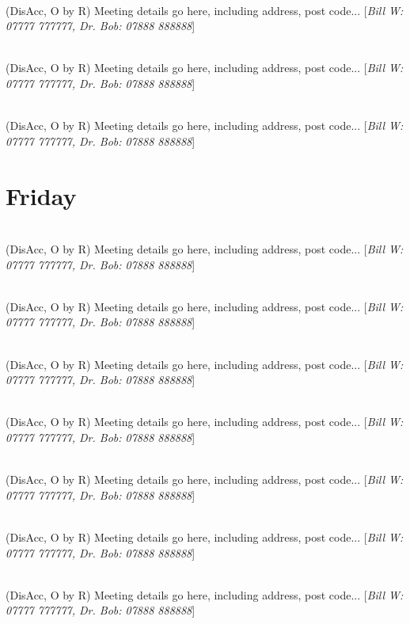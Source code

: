\documentclass[a4paper]{article}
\newcommand{\mtgname}[1] {\vspace{0.1cm}{\bf #1}\\}   %
\newcommand{\mtgtime}[1] {\hspace{-0.2cm}{\small #1}} %
\newcommand{\mtgdetails}[1] {#1}                      %
\newcommand{\mtgphones}[1] {[\textit{#1}]}            %
\begin{document}
\mtgname{Meeting name goes here}
\mtgtime{12:45--13:45} \mtgdetails{(DisAcc, O by R) Meeting details go here, including address, post code...}
\mtgphones{Bill W: 07777 777777, Dr. Bob: 07888 888888}

\mtgname{Meeting name goes here}
\mtgtime{12:45--13:45} \mtgdetails{(DisAcc, O by R) Meeting details go here, including address, post code...}
\mtgphones{Bill W: 07777 777777, Dr. Bob: 07888 888888}

\mtgname{Meeting name goes here}
\mtgtime{12:45--13:45} \mtgdetails{(DisAcc, O by R) Meeting details go here, including address, post code...}
\mtgphones{Bill W: 07777 777777, Dr. Bob: 07888 888888}

\section*{Friday}

\mtgname{Meeting name goes here}
\mtgtime{12:45--13:45} \mtgdetails{(DisAcc, O by R) Meeting details go here, including address, post code...}
\mtgphones{Bill W: 07777 777777, Dr. Bob: 07888 888888}

\mtgname{Meeting name goes here}
\mtgtime{12:45--13:45} \mtgdetails{(DisAcc, O by R) Meeting details go here, including address, post code...}
\mtgphones{Bill W: 07777 777777, Dr. Bob: 07888 888888}

\mtgname{Meeting name goes here}
\mtgtime{12:45--13:45} \mtgdetails{(DisAcc, O by R) Meeting details go here, including address, post code...}
\mtgphones{Bill W: 07777 777777, Dr. Bob: 07888 888888}

\mtgname{Meeting name goes here}
\mtgtime{12:45--13:45} \mtgdetails{(DisAcc, O by R) Meeting details go here, including address, post code...}
\mtgphones{Bill W: 07777 777777, Dr. Bob: 07888 888888}

\mtgname{Meeting name goes here}
\mtgtime{12:45--13:45} \mtgdetails{(DisAcc, O by R) Meeting details go here, including address, post code...}
\mtgphones{Bill W: 07777 777777, Dr. Bob: 07888 888888}

\mtgname{Meeting name goes here}
\mtgtime{12:45--13:45} \mtgdetails{(DisAcc, O by R) Meeting details go here, including address, post code...}
\mtgphones{Bill W: 07777 777777, Dr. Bob: 07888 888888}

\mtgname{Meeting name goes here}
\mtgtime{12:45--13:45} \mtgdetails{(DisAcc, O by R) Meeting details go here, including address, post code...}
\mtgphones{Bill W: 07777 777777, Dr. Bob: 07888 888888}
\end{document}
